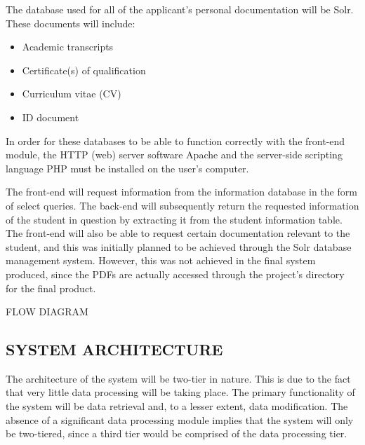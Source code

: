 \documentclass[journal,comsoc,onecolumn]{IEEEtran}
\begin{document}
\hfill \break The database used for all of the applicant's personal documentation will be Solr. These documents will include:

\begin{itemize}
	\item Academic transcripts
	\item Certificate(s) of qualification
	\item Curriculum vitae (CV)
	\item ID document
\end{itemize}

\hfill \break In order for these databases to be able to function correctly with the front-end module, the HTTP (web) server software Apache and the server-side scripting language PHP must be installed on the user's computer.

\hfill \break The front-end will request information from the information database in the form of select queries. The back-end will subsequently return the requested information of the student in question by extracting it from the student information table. The front-end will also be able to request certain documentation relevant to the student, and this was initially planned to be achieved through the Solr database management system. However, this was not achieved in the final system produced, since the PDFs are actually accessed through the project's directory for the final product.

\break FLOW DIAGRAM


\subsection{SYSTEM ARCHITECTURE}

The architecture of the system will be two-tier in nature. This is due to the fact that very little data processing will be taking place. The primary functionality of the system will be data retrieval and, to a lesser extent, data modification. The absence of a significant data processing module implies that the system will only be two-tiered, since a third tier would be comprised of the data processing tier.

\end{document}
